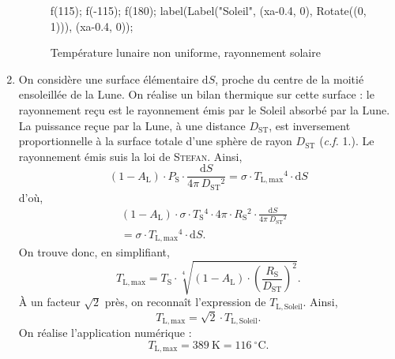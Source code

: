 \documentclass[a4paper, 11pt]{article}
\let\gguillemotleft\guillemotleft
\let\gguillemotright\guillemotright
\def\guillemotleft{\textsf{\gguillemotleft}}
\def\guillemotright{\textsf{\gguillemotright}}
\let\underline\ul
\begin{document}
\begin{multicols}{2}
\begin{enumerate}[start=8]
\begin{figure}[H]
\begin{asy}
						f(115);
						f(-115);
						f(180);
						label(Label("Soleil", (xa-0.4, 0), Rotate((0, 1))), (xa-0.4, 0));
					\end{asy}
					\caption{Température lunaire non uniforme, rayonnement solaire}
				\end{figure}
			\item On considère une surface élémentaire $\mathrm{d}S$, proche du centre de la moitié ensoleillée de la Lune.
				On réalise un bilan thermique sur cette surface : le rayonnement reçu est le rayonnement émis par le Soleil absorbé par la Lune. La puissance reçue par la Lune, à une distance $D_\mathrm{ST}$, est inversement proportionnelle à la surface totale d'une sphère de rayon $D_\mathrm{ST}$ (\textit{c.f.} 1.). Le rayonnement émis suis la loi de \textsc{Stefan}. Ainsi, \[
					(1 - A_\mathrm{L}) \cdot P_\mathrm{S} \cdot \frac{\mathrm{d}S}{4\pi\, D_\mathrm{ST}{}^2} = \sigma \cdot T_\mathrm{L,max}{}^4 \cdot \mathrm{d}S
				\] d'où,
				\begin{align*}
						(1 - A_\mathrm{L}) \cdot \sigma \cdot T_\mathrm{S}{}^4 \cdot 4\pi\cdot R_\mathrm{S}{}^2 \cdot \frac{\mathrm{d}S}{4\pi\: D_\mathrm{ST}{}^2}\\
						=\sigma\cdot  T_\mathrm{L,max}{}^4 \cdot \mathrm{d}S.&
				\end{align*}
				On trouve donc, en simplifiant, \[
					T_\mathrm{L,max} = T_\mathrm{S} \cdot \sqrt[4]{(1-A_\mathrm{L}) \cdot \left( \frac{R_\mathrm{S}}{D_\mathrm{ST}} \right)^{\!\!2}}
				.\] À un facteur $\sqrt{2}$\/ près, on reconnaît l'expression de $T_\mathrm{L,Soleil}$. Ainsi, \[
					\boxed{T_\mathrm{L,max} = \sqrt{2} \cdot T_\mathrm{L, Soleil}.}
				\] On réalise l'application numérique : \[
				\boxed{T_\mathrm{L,max} = 389\: \mathrm{K} = 116\:^\circ \mathrm{C}.}
				\]
		\end{enumerate}

		\noindent{\large\itshape IV.\ \underline{Le \guillemotleft~claire de Terre.~\guillemotright}}
	\end{multicols}
	
\end{document}
